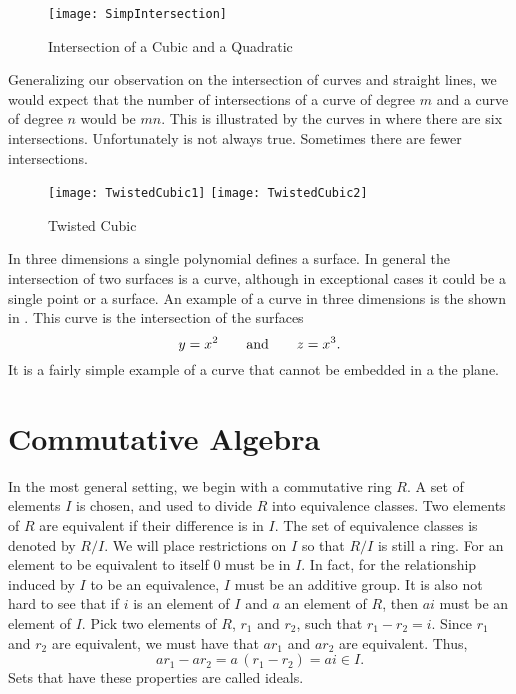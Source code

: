 \begin{figure}
\begin{center}
\texttt{[image: SimpIntersection]}
\end{center}
\caption{Intersection of a Cubic and a Quadratic\label{Intersect:Fig}}
\end{figure}

Generalizing our observation on the intersection of curves and
straight lines, we would expect that the number of intersections of a
curve of degree $m$ and a curve of degree $n$ would be $mn$.  This is
illustrated by the curves in  where there are
six intersections.  Unfortunately is not always true.  Sometimes there
are fewer intersections.

\begin{figure}
\begin{center}
  \texttt{[image: TwistedCubic1]}
    \hfil 
  \texttt{[image: TwistedCubic2]}
\end{center}
\caption{Twisted Cubic\label{Twisted:Cubic:Fig}}
\end{figure}
In three dimensions a single polynomial defines a surface.  In
general the intersection of two surfaces is a curve, although in
exceptional cases it could be a single point or a surface.  An example
of a curve in three dimensions is the  shown in
.  This curve is the intersection of the surfaces
\[
y= x^2 \qquad \hbox{and}\qquad z=x^3.
\]
It is a fairly simple example of a curve that cannot be embedded in a
the plane.

\section{Commutative Algebra}

In the most general setting, we begin with a commutative ring $R$.  A
set of elements $I$ is chosen, and used to divide $R$ into equivalence
classes.  Two elements of $R$ are equivalent if their difference is in
$I$.  The set of equivalence classes is denoted by $R/I$.  We will
place restrictions on $I$ so that $R/I$ is still a ring.  For an
element to be equivalent to itself $0$ must be in $I$.  In fact, for
the relationship induced by $I$ to be an equivalence, $I$ must be an
additive group.  It is also not hard to see that if $i$ is an element
of $I$ and $a$ an element of $R$, then $ai$ must be an element of $I$.
Pick two elements of $R$, $r_1$ and $r_2$, such that $r_1 - r_2 = i$.
Since $r_1$ and $r_2$ are equivalent, we must have that $a r_1$ and
$ar_2$ are equivalent.  Thus, $$a r_1 - a r_2 = a \,(r_1 - r_2) = a i
\in I.$$ Sets that have these properties are called ideals.

